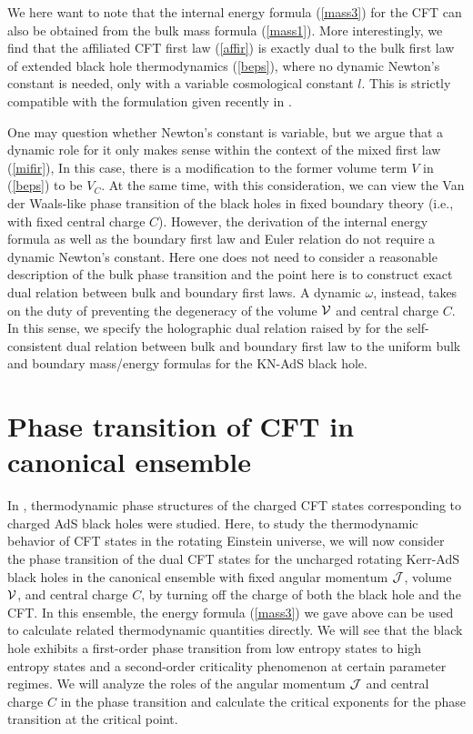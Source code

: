 \documentclass[a4paper,11pt]{article}
\newcommand{\eq}[1]{(\ref{#1})}
\begin{document}
We here want to note that the internal energy formula \eq{mass3} for the CFT can also be obtained from the bulk mass formula \eq{mass1}. More interestingly, we find that the affiliated CFT first law \eq{affir} is exactly dual to the bulk first law of extended black hole thermodynamics \eq{beps}, where no dynamic Newton's constant is needed, only with a variable cosmological constant $l$. This is strictly compatible with the formulation given recently in \cite{Ahmed:2023snm}.

One may question whether Newton's constant is variable, but we argue that a dynamic role for it only makes sense within the context of the mixed first law \eq{mifir}, In this case,  there is a modification to the former volume term $V$ in \eq{beps} to be $V_C$. At the same time, with this consideration, we can view the Van der Waals-like phase transition of the black holes in fixed boundary theory (i.e., with fixed central charge $C$). However, the derivation of the internal energy formula as well as the boundary first law and Euler relation do not require a dynamic Newton's constant. Here one does not need to consider a reasonable description of the bulk phase transition and the point here is to construct exact dual relation between bulk and boundary first laws. A dynamic $\omega$, instead, takes on the duty of preventing the degeneracy of the volume $\mathcal{V}$ and central charge $C$. In this sense, we specify the holographic dual relation raised by  \cite{Ahmed:2023snm} for the self-consistent dual relation between bulk and boundary first law to the uniform bulk and boundary mass/energy formulas for the  KN-AdS black hole. 





\section{Phase transition of CFT in canonical ensemble }\label{caen}

In \cite{Cong:2021jgb}, thermodynamic phase structures of the charged CFT states corresponding to  charged AdS black holes were studied. Here, to study the thermodynamic behavior of CFT states in the rotating Einstein universe, we will now consider the phase transition of the dual CFT states for the uncharged rotating Kerr-AdS black holes in the canonical ensemble with fixed angular momentum $\mathcal{J}$, volume $\mathcal{V}$, and central charge $C$, by turning off the charge of both the black hole and the CFT.  In this ensemble, the energy formula \eq{mass3} we gave above can be used to calculate related thermodynamic quantities directly.  We will see that the black hole exhibits a first-order phase transition from low entropy states to high entropy states and a second-order criticality phenomenon at certain parameter regimes. We will analyze the roles of the angular momentum $\mathcal{J}$ and central charge $C$ in the phase transition and calculate the critical exponents for the phase transition at the critical point.
\end{document}
